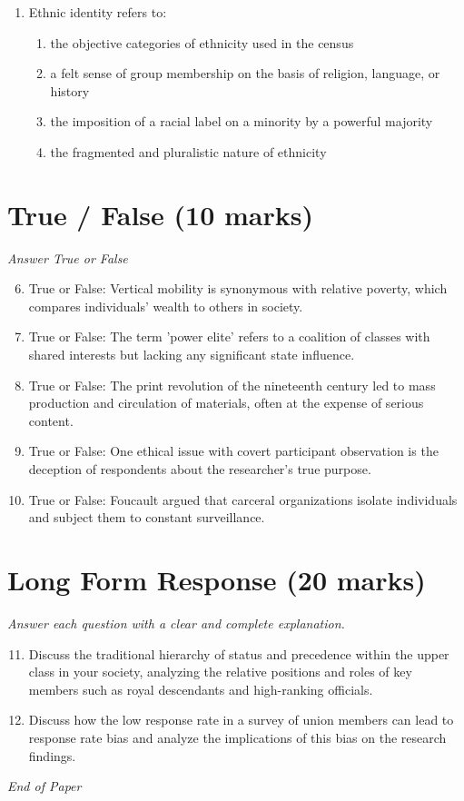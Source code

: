 \documentclass[12pt]{article}
\begin{document}
\begin{enumerate}[label=\arabic*.]
\begin{enumerate}[label=(\alph*)]
    \item creating 'reverse flows' of their own programmes back to imperial societies
    \item all of the above
\end{enumerate}
\item Ethnic identity refers to:
\begin{enumerate}[label=(\alph*)]
    \item the objective categories of ethnicity used in the census
    \item a felt sense of group membership on the basis of religion, language, or history
    \item the imposition of a racial label on a minority by a powerful majority
    \item the fragmented and pluralistic nature of ethnicity
\end{enumerate}
\end{enumerate}

\section*{True / False (10 marks)}
\textit{Answer True or False}
\begin{enumerate}[label=\arabic*.]
\setcounter{enumi}{5}
\item True or False: Vertical mobility is synonymous with relative poverty, which compares individuals' wealth to others in society.
\item True or False: The term 'power elite' refers to a coalition of classes with shared interests but lacking any significant state influence.
\item True or False: The print revolution of the nineteenth century led to mass production and circulation of materials, often at the expense of serious content.
\item True or False: One ethical issue with covert participant observation is the deception of respondents about the researcher's true purpose.
\item True or False: Foucault argued that carceral organizations isolate individuals and subject them to constant surveillance.
\end{enumerate}

\section*{Long Form Response (20 marks)}
\textit{Answer each question with a clear and complete explanation.}
\begin{enumerate}[label=\arabic*.]
\setcounter{enumi}{10}
\item Discuss the traditional hierarchy of status and precedence within the upper class in your society, analyzing the relative positions and roles of key members such as royal descendants and high-ranking officials.
\item Discuss how the low response rate in a survey of union members can lead to response rate bias and analyze the implications of this bias on the research findings.
\end{enumerate}

\vfill
\noindent\textit{End of Paper}
\end{document}
